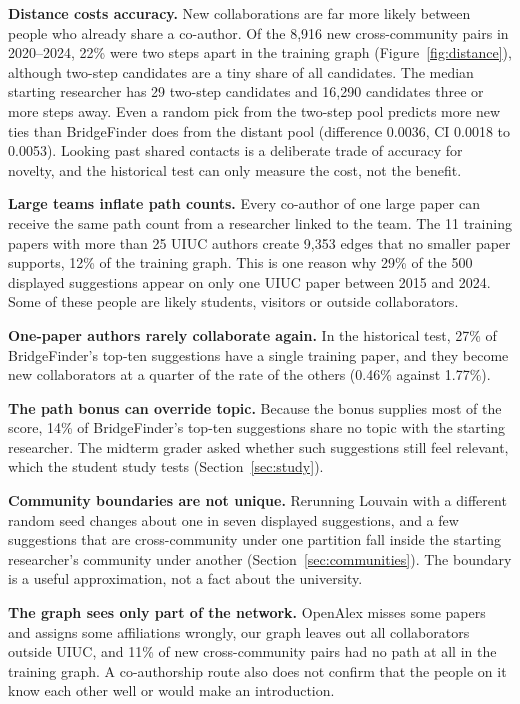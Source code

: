 \documentclass[sigconf,nonacm]{acmart}
\begin{document}
\textbf{Distance costs accuracy.} New collaborations are far more likely between people who already share a co-author. Of the 8,916 new cross-community pairs in 2020--2024, 22\% were two steps apart in the training graph (Figure~\ref{fig:distance}), although two-step candidates are a tiny share of all candidates. The median starting researcher has 29 two-step candidates and 16,290 candidates three or more steps away. Even a random pick from the two-step pool predicts more new ties than BridgeFinder does from the distant pool (difference 0.0036, CI 0.0018 to 0.0053). Looking past shared contacts is a deliberate trade of accuracy for novelty, and the historical test can only measure the cost, not the benefit.

\textbf{Large teams inflate path counts.} Every co-author of one large paper can receive the same path count from a researcher linked to the team. The 11 training papers with more than 25 UIUC authors create 9,353 edges that no smaller paper supports, 12\% of the training graph. This is one reason why 29\% of the 500 displayed suggestions appear on only one UIUC paper between 2015 and 2024. Some of these people are likely students, visitors or outside collaborators.

\textbf{One-paper authors rarely collaborate again.} In the historical test, 27\% of BridgeFinder's top-ten suggestions have a single training paper, and they become new collaborators at a quarter of the rate of the others (0.46\% against 1.77\%).

\textbf{The path bonus can override topic.} Because the bonus supplies most of the score, 14\% of BridgeFinder's top-ten suggestions share no topic with the starting researcher. The midterm grader asked whether such suggestions still feel relevant, which the student study tests (Section~\ref{sec:study}).

\textbf{Community boundaries are not unique.} Rerunning Louvain with a different random seed changes about one in seven displayed suggestions, and a few suggestions that are cross-community under one partition fall inside the starting researcher's community under another (Section~\ref{sec:communities}). The boundary is a useful approximation, not a fact about the university.

\textbf{The graph sees only part of the network.} OpenAlex misses some papers and assigns some affiliations wrongly, our graph leaves out all collaborators outside UIUC, and 11\% of new cross-community pairs had no path at all in the training graph. A co-authorship route also does not confirm that the people on it know each other well or would make an introduction.
\end{document}
